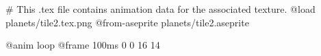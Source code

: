 # This .tex file contains animation data for the associated texture.
@load planets/tile2.tex.png
@from-aseprite planets/tile2.aseprite

@anim loop
	@frame 100ms 0 0 16 14
